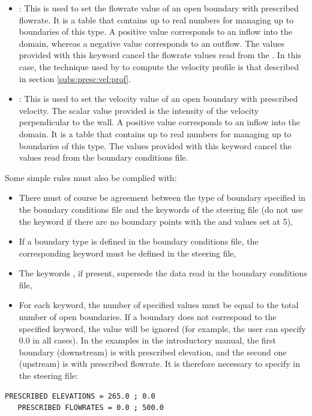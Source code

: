 \begin{itemize}
\item {}:
This is used to set the flowrate value of an open boundary with prescribed
flowrate.
It is a table that contains up to  real numbers for managing up
to  boundaries of this type.
A positive value corresponds to an inflow into the domain, whereas a negative
value corresponds to an outflow.
The values provided with this keyword cancel the flowrate values read
from the .
In this case, the technique used by  to compute the velocity profile
is that described in section \ref{subs:presc:vel:prof}.

\item {}:
This is used to set the velocity value of an open boundary with prescribed
velocity.
The scalar value provided is the intensity of the velocity perpendicular
to the wall.
A positive value corresponds to an inflow into the domain.
It is a table that contains up to  real numbers for managing up
to  boundaries of this type.
The values provided with this keyword cancel the values read
from the boundary conditions file.
\end{itemize}

Some simple rules must also be complied with:

\begin{itemize}
\item There must of course be agreement between the type of boundary specified
in the boundary conditions file and the keywords of the steering file
(do not use the keyword  if there are no boundary
points with the  and  values set at 5),

\item If a boundary type is defined in the boundary conditions file,
the corresponding keyword must be defined in the steering file,

\item The keywords , if present,
supersede the data read in the boundary conditions file,

\item For each keyword, the number of specified values must be equal
to the total number of open boundaries.
If a boundary does not correspond to the specified keyword, the value will be
ignored (for example, the user can specify 0.0 in all cases).
In the examples in the introductory manual, the first boundary (downstream)
is with prescribed elevation, and the second one (upstream) is with prescribed
flowrate.
It is therefore necessary to specify in the steering file:
\end{itemize}
\begin{lstlisting}[language=bash]
   PRESCRIBED ELEVATIONS = 265.0 ; 0.0
   PRESCRIBED FLOWRATES = 0.0 ; 500.0
\end{lstlisting}

